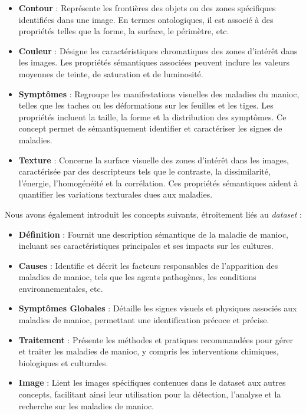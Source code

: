 \documentclass{article}
\begin{document}
	\begin{itemize}
		\item \textbf{Contour} : Représente les frontières des objets ou des zones spécifiques identifiées dans une image. En termes ontologiques, il est associé à des propriétés telles que la forme, la surface, le périmètre, etc.
		
		\item \textbf{Couleur} : Désigne les caractéristiques chromatiques des zones d'intérêt dans les images. Les propriétés sémantiques associées peuvent inclure les valeurs moyennes de teinte, de saturation et de luminosité.
		
		\item \textbf{Symptômes} : Regroupe les manifestations visuelles des maladies du manioc, telles que les taches ou les déformations sur les feuilles et les tiges. Les propriétés incluent la taille, la forme et la distribution des symptômes. Ce concept permet de sémantiquement identifier et caractériser les signes de maladies.
		
		\item \textbf{Texture} : Concerne la surface visuelle des zones d'intérêt dans les images, caractérisée par des descripteurs tels que le contraste, la dissimilarité, l'énergie, l'homogénéité et la corrélation. Ces propriétés sémantiques aident à quantifier les variations texturales dues aux maladies.
	\end{itemize}
	
	Nous avons également introduit les concepts suivants, étroitement liés au \textit{dataset} :
	
	\begin{itemize}
		\item \textbf{Définition} : Fournit une description sémantique de la maladie de manioc, incluant ses caractéristiques principales et ses impacts sur les cultures.
		
		\item \textbf{Causes} : Identifie et décrit les facteurs responsables de l'apparition des maladies de manioc, tels que les agents pathogènes, les conditions environnementales, etc.
		
		\item \textbf{Symptômes Globales} : Détaille les signes visuels et physiques associés aux maladies de manioc, permettant une identification précoce et précise.
		
		\item \textbf{Traitement} : Présente les méthodes et pratiques recommandées pour gérer et traiter les maladies de manioc, y compris les interventions chimiques, biologiques et culturales.
		
		\item \textbf{Image} : Lient les images spécifiques contenues dans le dataset aux autres concepts, facilitant ainsi leur utilisation pour la détection, l'analyse et la recherche sur les maladies de manioc.
	\end{itemize}
	
\end{document}
